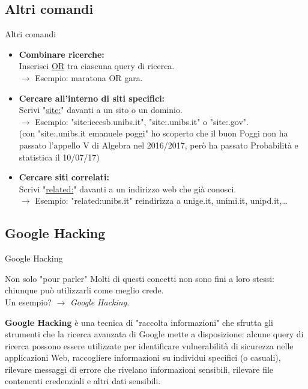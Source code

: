 \documentclass{beamer}
\begin{document}
\subsection{Altri comandi}
\begin{frame}{Altri comandi}
\begin{itemize}
\item \textbf{Combinare ricerche:}\\
Inserisci \underline{OR} tra ciascuna query di ricerca.\\ $\rightarrow$ Esempio: maratona OR gara.
\item \textbf{Cercare all'interno di siti specifici:}\\
Scrivi "\underline{site:}" davanti a un sito o un dominio.\\ $\rightarrow$ Esempio: "site:ieeesb.unibs.it", "site:.unibs.it" o "site:.gov".\\
(con "site:.unibs.it emanuele poggi" ho scoperto che il buon Poggi non ha passato l'appello V di Algebra nel 2016/2017, però ha passato Probabilità e statistica il 10/07/17)
\item \textbf{Cercare siti correlati:}\\
Scrivi "\underline{related:}" davanti a un indirizzo web che già conosci.\\ $\rightarrow$ Esempio: "related:unibs.it" reindirizza a unige.it, unimi.it, unipd.it,\ldots
\end{itemize}
\end{frame}

\subsection{Google Hacking}
\begin{frame}{Google Hacking}
\begin{block}{Non solo "pour parler"}
Molti di questi concetti non sono fini a loro stessi: chiunque può utilizzarli come meglio crede.  \\Un esempio? $\rightarrow$ \textit{Google Hacking}.
\end{block}
\medskip \textbf{Google Hacking} è una tecnica di "raccolta informazioni" che sfrutta gli strumenti che la ricerca avanzata di Google mette a disposizione: alcune query di ricerca possono essere utilizzate per identificare vulnerabilità di sicurezza nelle applicazioni Web, raccogliere informazioni su individui specifici (o casuali), rilevare messaggi di errore che rivelano informazioni sensibili, rilevare file contenenti credenziali e altri dati sensibili.
\end{frame}
\end{document}
